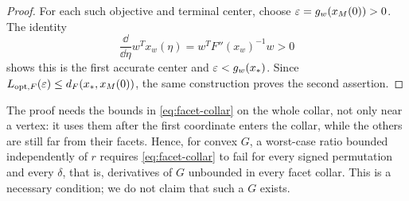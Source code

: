 \begin{proof}
For each such objective and terminal center, choose
$\varepsilon=g_w(x_M(0))>0$. The identity
\[
 \frac{\dd}{\dd\eta}w^Tx_w(\eta)=w^TF''(x_w)^{-1}w>0
\]
shows this is the first accurate center and
$\varepsilon<g_w(x_*)$. Since
$L_{\mathrm{opt},F}(\varepsilon)\leq d_F(x_*,x_M(0))$, the same construction
proves the second assertion.
\end{proof}
The proof needs the bounds in \eqref{eq:facet-collar} on the whole
collar, not only near a vertex: it uses them after the first coordinate
enters the collar, while the others are still far from their facets.
Hence, for convex $G$, a worst-case ratio bounded independently of $r$
requires \eqref{eq:facet-collar} to fail for every signed permutation
and every $\delta$, that is, derivatives of $G$ unbounded in every
facet collar. This is a necessary condition; we do
not claim that such a $G$ exists.

